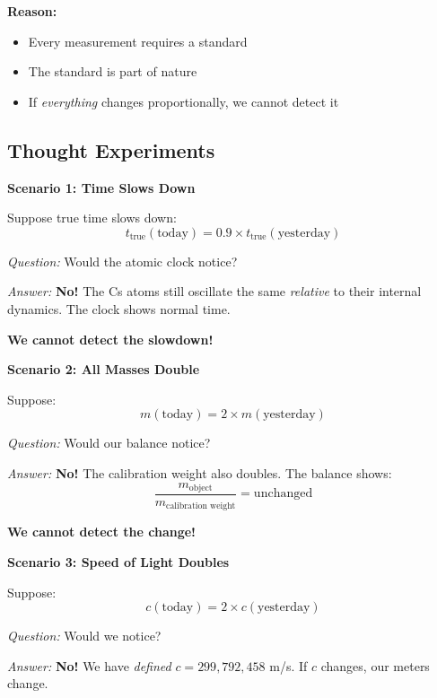 \textbf{Reason:}
\begin{itemize}[nosep]
	\item Every measurement requires a standard
	\item The standard is part of nature
	\item If \textit{everything} changes proportionally, we cannot detect it
\end{itemize}

\subsection{Thought Experiments}

\textbf{Scenario 1: Time Slows Down}

Suppose true time slows down:
\begin{equation}
	t_\text{true}(\text{today}) = 0.9 \times t_\text{true}(\text{yesterday})
\end{equation}

\textit{Question:} Would the atomic clock notice?

\textit{Answer:} \textbf{No!} The Cs atoms still oscillate the same \textit{relative} to their internal dynamics. The clock shows normal time.

\textbf{We cannot detect the slowdown!}

\textbf{Scenario 2: All Masses Double}

Suppose:
\begin{equation}
	m(\text{today}) = 2 \times m(\text{yesterday})
\end{equation}

\textit{Question:} Would our balance notice?

\textit{Answer:} \textbf{No!} The calibration weight also doubles. The balance shows:
\begin{equation}
	\frac{m_\text{object}}{m_\text{calibration weight}} = \text{unchanged}
\end{equation}

\textbf{We cannot detect the change!}

\textbf{Scenario 3: Speed of Light Doubles}

Suppose:
\begin{equation}
	c(\text{today}) = 2 \times c(\text{yesterday})
\end{equation}

\textit{Question:} Would we notice?

\textit{Answer:} \textbf{No!} We have \textit{defined} $c = 299,792,458$ m/s. If $c$ changes, our meters change.

